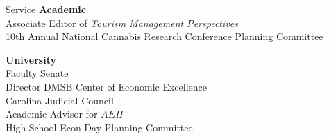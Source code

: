 \documentclass{resume}
\begin{document}



%
%
%
%	
	
\begin{rSection}{Service}
\hspace{-2ex}\textbf{Academic}\\
Associate Editor of \textit{Tourism Management Perspectives}\\
10th Annual National Cannabis Research Conference Planning Committee 

\hspace{-2ex}\textbf{University}\\
Faculty Senate\\
Director DMSB  Center of Economic Excellence\\
Carolina Judicial Council\\
Academic Advisor for \( A E \Pi \)\\
High School Econ Day Planning Committee


	

	
\end{rSection}
\end{document}
